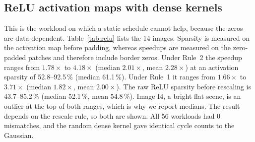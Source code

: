 \documentclass[11pt,journal,draftclsnofoot,onecolumn]{IEEEtran}
\begin{document}
\subsection{ReLU activation maps with dense kernels}\label{sec:r-relu}
This is the workload on which a static schedule cannot help, because the zeros are
data-dependent. Table~\ref{tab:relu} lists the 14 images. Sparsity is measured on the
activation map before padding, whereas speedups are measured on the zero-padded patches
and therefore include border zeros. Under Rule~2 the speedup ranges from $1.78\times$ to
$4.18\times$ (median $2.01\times$, mean $2.28\times$) at an activation sparsity of
52.8--92.5\,\% (median 61.1\,\%). Under Rule~1 it ranges from $1.66\times$ to $3.71\times$
(median $1.82\times$, mean $2.00\times$). The raw ReLU sparsity before rescaling is
43.7--85.2\,\% (median 52.1\,\%, mean 54.8\,\%). Image I4, a bright flat scene, is an
outlier at the top of both ranges, which is why we report medians. The result depends on
the rescale rule, so both are shown. All 56 workloads had 0 mismatches, and the random
dense kernel gave identical cycle counts to the Gaussian.
\end{document}
